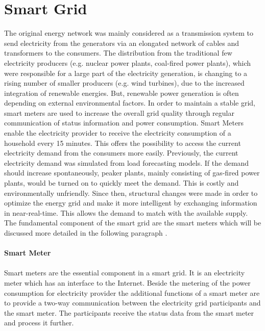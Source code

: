 \section{Smart Grid}
The original energy network was mainly considered as a transmission system to send electricity from the generators via an elongated network of cables and transformers to the consumers.%
The distribution from the traditional few electricity producers (e.g. nuclear power plants, coal-fired power plants), which were responsible for a large part of the electricity generation, is changing to a rising number of smaller producers (e.g. wind turbines), due to the increased integration of renewable energies. %
But, renewable power generation is often depending on external environmental factors. In order to maintain a stable grid, smart meters are used to increase the overall grid quality through regular communication of status information and power consumption. Smart Meters enable the electricity provider to receive the electricity consumption of a household every 15 minutes. This offers the possibility to access the current electricity demand from the consumers more easily. Previously, the current electricity demand was simulated from load forecasting models. If the demand should increase spontaneously, peaker plants, mainly consisting of gas-fired power plants, would be turned on to quickly meet the demand. This is costly and environmentally unfriendly. 
Since then, structural changes were made in order to optimize the energy grid and make it more intelligent by exchanging information in near-real-time. This allows the demand to match with the available supply. The fundamental component of the smart grid are the smart meters which will be discussed more detailed in the following paragraph \cite{fan2012smart}\cite{zeadally2013towards}.\\
\\
\textbf{Smart Meter}
\\
\\
Smart meters are the essential component in a smart grid. It is an electricity meter which has an interface to the Internet. Beside the metering of the power consumption for electricity provider the additional functions of a smart meter are to provide a two-way communication between the electricity grid participants and the smart meter. The participants receive the status data from the smart meter and process it further.
